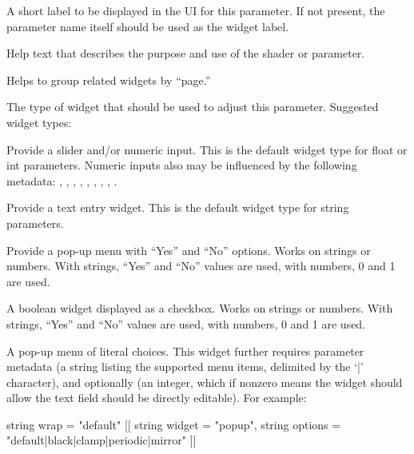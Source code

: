 \documentclass[11pt,letterpaper]{book}
\begin{document}
A short label to be displayed in the UI for this parameter.  If not
present, the parameter name itself should be used as the widget label.
\apiend

Help text that describes the purpose and use of the shader or parameter.
\apiend

Helps to group related widgets by ``page.''
\apiend

The type of widget that should be used to adjust this parameter.
Suggested widget types:

\vspace{12pt}
Provide a slider and/or numeric input. This is the default widget type
for {\cf float} or {\cf int} parameters.  Numeric inputs also may be
influenced by the following metadata: , ,
, , , ,
, , .
\apiend
\vspace{-16pt}

\vspace{12pt}
Provide a text entry widget. This is the default widget type for
{\cf string} parameters.
\apiend
\vspace{-16pt}

\vspace{12pt}
Provide a pop-up menu with ``Yes'' and ``No'' options. Works on strings
or numbers.  With strings, ``Yes'' and ``No'' values are used, with
numbers, 0 and 1 are used.
\apiend
\vspace{-16pt}

\vspace{12pt}
A boolean widget displayed as a checkbox. Works on strings or
numbers. With strings, ``Yes'' and ``No'' values are used, with numbers,
0 and 1 are used.
\apiend
\vspace{-12pt}

\vspace{12pt}
A pop-up menu of literal choices. This widget further requires
parameter metadata  (a string listing the supported
menu items, delimited by the `{\cf |}' character), and optionally 
(an integer, which if nonzero means the widget should allow the
text field should be directly editable).  For example:
\begin{code}
    string wrap = "default"
        [[ string widget = "popup",
           string options = "default|black|clamp|periodic|mirror" ]]
\end{code}
\apiend
\vspace{-16pt}
\end{document}

